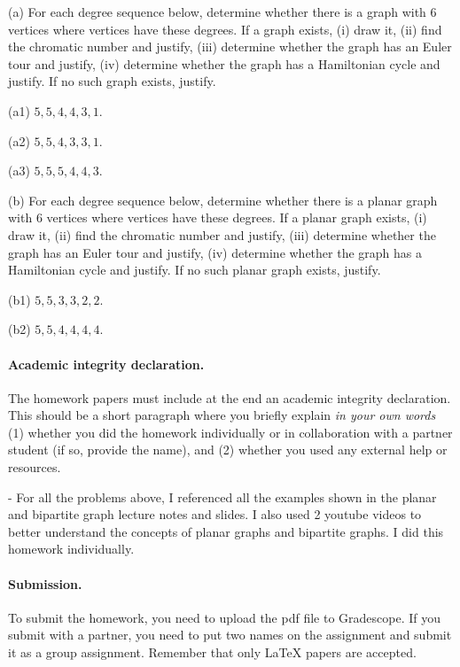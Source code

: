 \documentclass{article}
\begin{document}
\vfill
\eject


\vskip 0.25in

\begin{problem}
(a) For each degree sequence below, determine whether there is a graph with $6$ vertices where vertices have
these degrees. If a graph exists,  (i) draw it, (ii) find the chromatic number and justify, (iii) determine whether the graph has an Euler tour and justify, (iv) determine whether the graph has a Hamiltonian cycle and justify. If no such graph exists, justify.
%
\begin{description}\setlength{\itemsep}{-3pt}
	\item{(a1)} $5, 5, 4, 4, 3, 1$.  
	\item{(a2)} $5, 5, 4, 3, 3, 1$. 
	\item{(a3)} $5, 5, 5, 4, 4, 3$.
\end{description}

(b) For each degree sequence below, determine whether there is a planar graph with $6$ vertices where vertices have
these degrees. If a planar graph exists, (i) draw it, (ii) find the chromatic number and justify, (iii) determine whether the graph has an Euler tour and justify, (iv) determine whether the graph has a Hamiltonian cycle and justify. If no such planar graph exists, justify.
%
\begin{description}\setlength{\itemsep}{-3pt}
	\item{(b1)} $5, 5, 3, 3, 2, 2$.
	\item{(b2)} $5, 5, 4, 4, 4, 4$.
\end{description}
\end{problem}


\paragraph{Academic integrity declaration.}
The homework papers must include at the end an academic integrity declaration. This should be a short paragraph where you briefly explain 
\emph{in your own words}  (1) whether you did the homework individually or in collaboration with a partner student (if so, provide the name), 
and (2) whether you used any external help or resources. 

\vspace{0.1in} - For all the problems above, I referenced all the examples shown in the planar and bipartite graph lecture notes and slides. I 
also used 2 youtube videos to better understand the concepts of planar graphs and bipartite graphs. I did this homework individually.


\vskip 0.1in
\paragraph{Submission.}
To submit the homework, you need to upload the pdf file to Gradescope. If you submit with a partner, you need
to put two names on the assignment and submit it as a group assignment.
Remember that only {\LaTeX} papers are accepted. 
\end{document}

